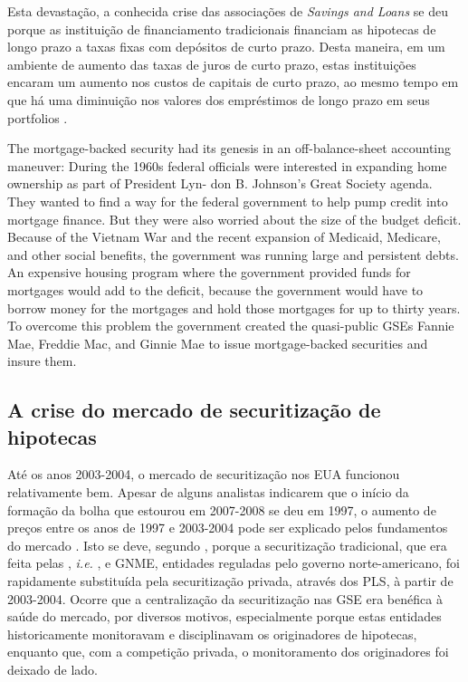 \documentclass[
	12pt,				%
	oneside,			%
	a4paper,			%
	chapter=TITLE,		%
	section=TITLE,		%
	english,			%
	brazil				%
	]{abntex2}
\begin{document}
\begin{refsection}
Esta devastação, a conhecida crise das associações de \emph{Savings and Loans} se deu
porque as instituição de financiamento tradicionais financiam as hipotecas de
longo prazo a taxas fixas com depósitos de curto prazo. Desta maneira, em um
ambiente de aumento das taxas de juros de curto prazo, estas instituições
encaram um aumento nos custos de capitais de curto prazo, ao mesmo tempo em que
há uma diminuição nos valores dos empréstimos de longo prazo em seus portfolios
\autocite[p.~215]{simkovic}.
\begin{citacao}
The mortgage-backed security had its genesis in an off-balance-sheet accounting
maneuver: During the 1960s federal officials were interested in expanding home
ownership as part of President Lyn- don B. Johnson’s Great Society agenda. They
wanted to find a way for the federal government to help pump credit into
mortgage finance. But they were also worried about the size of the budget
deficit. Because of the Vietnam War and the recent expansion of Medicaid,
Medicare, and other social benefits, the government was running large and
persistent debts. An expensive housing program where the government provided
funds for mortgages would add to the deficit, because the government would have
to borrow money for the mortgages and hold those mortgages for up to thirty
years. To overcome this problem the government created the quasi-public GSEs
Fannie Mae, Freddie Mac, and Ginnie Mae to issue mortgage-backed securities and
insure them.
\cite[31-32]{fligstein}
\end{citacao}
\hypertarget{a-crise-do-mercado-de-securitizauxe7uxe3o-de-hipotecas}{%
\subsection{A crise do mercado de securitização de hipotecas}\label{a-crise-do-mercado-de-securitizauxe7uxe3o-de-hipotecas}}

Até os anos 2003-2004, o mercado de securitização nos EUA funcionou
relativamente bem. Apesar de alguns analistas indicarem que o início da formação
da bolha que estourou em 2007-2008 se deu em 1997, o aumento de preços entre os
anos de 1997 e 2003-2004 pode ser explicado pelos fundamentos do mercado
\autocite[p.~1182]{levitin2012}. Isto se deve, segundo \textcite[p.~1183]{levitin2012}, porque a
securitização tradicional, que era feita pelas , \emph{i.e.}
,  e \gls{GNME}, entidades reguladas pelo
governo norte-americano, foi rapidamente substituída pela securitização privada,
através dos \gls{PLS}, à partir de 2003-2004. Ocorre que a centralização da
securitização nas \gls{GSE} era benéfica à saúde do mercado, por diversos
motivos, especialmente porque estas entidades historicamente monitoravam e
disciplinavam os originadores de hipotecas, enquanto que, com a competição
privada, o monitoramento dos originadores foi deixado de lado.


\end{refsection}
\end{document}
